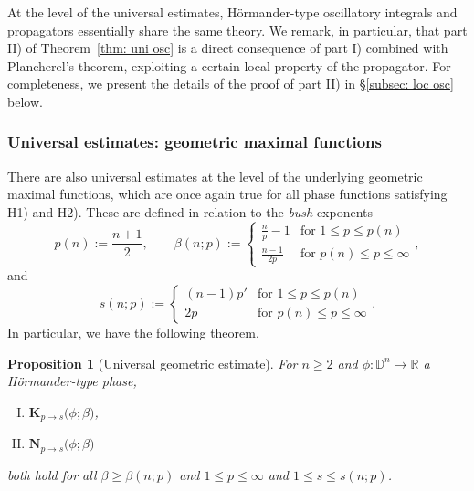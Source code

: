 \documentclass[reqno]{amsart}
\numberwithin{equation}{section}
\newcommand{\D}{\mathbb{D}}
\newcommand{\R}{\mathbb{R}}
\newcommand{\bK}{\mathbf{K}}
\newcommand{\bN}{\mathbf{N}}
\theoremstyle{plain}
\newtheorem{proposition}[theorem]{Proposition}
\theoremstyle{definition}
\begin{document}
At the level of the universal estimates, H\"ormander-type oscillatory integrals and propagators essentially share the same theory. We remark, in particular, that part II) of Theorem~\ref{thm: uni osc} is a direct consequence of part I) combined with Plancherel's theorem, exploiting a certain local property of the propagator. For completeness, we present the details of the proof of part II) in \S\ref{subsec: loc osc} below. 






\subsubsection*{Universal estimates: geometric maximal functions} There are also universal estimates at the level of the underlying geometric maximal functions, which are once again true for all phase functions satisfying H1) and H2). These are defined in relation to the \textit{bush} exponents
\begin{equation}\label{eq: bush exp}
  p(n) :=   \frac{n+1}{2},  \qquad \beta(n; p) := 
  \begin{cases}
      \frac{n}{p} - 1 & \textrm{for $1 \leq p \leq p(n)$} \\
      \frac{n-1}{2p} & \textrm{for $p(n) \leq p \leq \infty$}
  \end{cases},
\end{equation}
and
\begin{equation}\label{eq: other bush exp}
  s(n; p) := 
  \begin{cases}
       (n-1) p' & \textrm{for $1 \leq p \leq p(n)$} \\
      2p & \textrm{for $p(n) \leq p \leq \infty$}
  \end{cases}.
\end{equation}
In particular, we have the following theorem. 

\begin{proposition}[Universal geometric estimate]\label{prop: univ Kak/Nik} For $n \geq 2$ and $\phi \colon \D^n \to \R$ a H\"ormander-type phase, 
\begin{enumerate}[I)]
    \item $\bK_{p \to s}\big(\phi;  \beta\big)$,
    \item $\bN_{p \to s}\big(\phi;  \beta\big)$
\end{enumerate}
both hold for all $\beta \geq \beta(n; p)$ and $1 \leq p \leq \infty$ and $1 \leq s \leq s(n;p)$.
\end{proposition}
\end{document}
